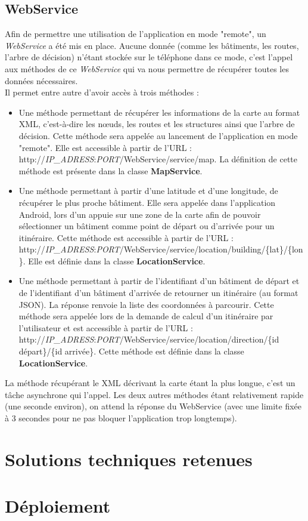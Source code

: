 \documentclass[12pt,a4paper,oneside]{article}
\begin{document}
\newpage

\subsection{WebService}
Afin de permettre une utilisation de l'application en mode "remote", un \textit{WebService} a été mis en place. Aucune donnée (comme les bâtiments, les routes, l'arbre de décision) n'étant stockée sur le téléphone dans ce mode, c'est l'appel aux méthodes de ce \textit{WebService} qui va nous permettre de récupérer toutes les données nécessaires. \\
Il permet entre autre d'avoir accès à trois méthodes :\\
\begin{itemize}
\item Une méthode permettant de récupérer les informations de la carte au format XML, c'est-à-dire les nœuds, les routes et les structures ainsi que l'arbre de décision. Cette méthode sera appelée au lancement de l'application en mode "remote". Elle est accessible à partir de l'URL : http://\textit{IP\_ADRESS}:\textit{PORT}/WebService/service/map. La définition de cette méthode est présente dans la classe \textbf{MapService}.
\item Une méthode permettant à partir d'une latitude et d'une longitude, de récupérer le plus proche bâtiment. Elle sera appelée dans l'application Android, lors d'un appuie sur une zone de la carte afin de pouvoir sélectionner un bâtiment comme point de départ ou d'arrivée pour un itinéraire. Cette méthode est accessible à partir de l'URL : http://\textit{IP\_ADRESS}:\textit{PORT}/WebService/service/location/building/\{lat\}/\{lon\}. Elle est définie dans la classe \textbf{LocationService}.
\item Une méthode permettant à partir de l'identifiant d'un bâtiment de départ et de l'identifiant d'un bâtiment d'arrivée de retourner un itinéraire (au format JSON). La réponse renvoie la liste des coordonnées à parcourir. Cette méthode sera appelée lors de la demande de calcul d'un itinéraire par l'utilisateur et est accessible à partir de l'URL : http://\textit{IP\_ADRESS}:\textit{PORT}/WebService/service/location/direction/\{id départ\}/\{id arrivée\}. Cette méthode est définie dans la classe \textbf{LocationService}.\\
\end{itemize}

La méthode récupérant le XML décrivant la carte étant la plus longue, c'est un tâche asynchrone qui l'appel. Les deux autres méthodes étant relativement rapide (une seconde environ), on attend la réponse du WebService (avec une limite fixée à 3 secondes pour ne pas bloquer l'application trop longtemps). 

\newpage

\section{Solutions techniques retenues}

\section{Déploiement}

\appendix
\end{document}
